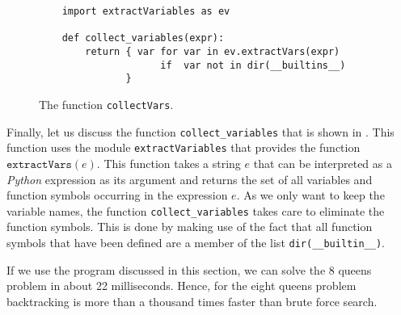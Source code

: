 \begin{figure}[!ht]
\centering
\begin{verbatim}
    import extractVariables as ev
    
    def collect_variables(expr):
        return { var for var in ev.extractVars(expr)
                     if  var not in dir(__builtins__)
               }
\end{verbatim}
\vspace*{-0.3cm}
\caption{The function \texttt{collectVars}.}
\label{fig:collect_variables.py}
\end{figure}
Finally, let us discuss the function \texttt{collect\_variables} that is shown in .
This function uses the module \texttt{extractVariables} that provides the function $\texttt{extractVars}(e)$.
This function takes a string $e$ that can be interpreted as a \textsl{Python} expression as its argument and
returns the set of all variables and function symbols occurring in the expression $e$.  As we only want to keep
the variable names, the function \texttt{collect\_variables} takes care to eliminate the function symbols.
This is done by making use of the fact that all function symbols that have been defined are a member of the
list \texttt{dir(\_\_builtin\_\_)}. 

If we use the program discussed in this section, we can solve the 8 queens problem in about 22 milliseconds.
Hence, for the eight queens problem backtracking is more than a thousand times faster than brute force search.

